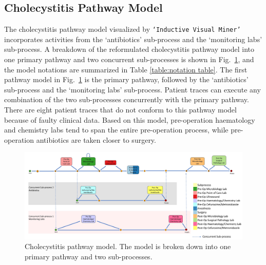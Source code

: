\documentclass{elsarticle}
\begin{document}
\subsection{Cholecystitis Pathway Model}
The cholecystitis pathway model visualized by \texttt{`Inductive Visual Miner'} incorporates activities from the `antibiotics' sub-process and the `monitoring labs' sub-process. A breakdown of the reformulated cholecystitis pathway model into one primary pathway and two concurrent sub-processes is shown in Fig.~\ref{fig:cholecystitis pathway model}, and the model notations are summarized in Table \ref{table:notation table}. The first pathway model in Fig.~\ref{fig:cholecystitis pathway model} is the primary pathway, followed by the `antibiotics’ sub-process and the `monitoring labs’ sub-process. Patient traces can execute any combination of the two sub-processes concurrently with the primary pathway. There are eight patient traces that do not conform to this pathway model because of faulty clinical data. Based on this model, pre-operation haematology and chemistry labs tend to span the entire pre-operation process, while pre-operation antibiotics are taken closer to surgery.

\begin{figure}[t]
\centering
\includegraphics[width=18cm,angle=270]{images/communicative_cholecystitis_process_models_anes.jpg}
\caption{Cholecystitis pathway model. The model is broken down into one primary pathway and two sub-processes.}
\label{fig:cholecystitis pathway model}
\end{figure}
\end{document}
